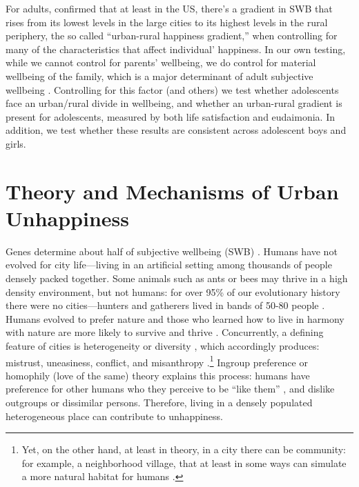 \documentclass[10pt, letterpaper]{article}
\begin{document}
\begin{spacing}{1.4}
For adults,  \citet{aok11a} confirmed that at least in the
US, there's a gradient in SWB that rises from its lowest levels in the large
cities to its highest levels in the rural periphery, the so called ``urban-rural
happiness gradient,'' when controlling for many of the characteristics that
affect individual' happiness. In our own testing, while we cannot control for
parents' wellbeing, we do control for material wellbeing of the family, which is
a major determinant of adult subjective wellbeing \citep{clark2018}. Controlling for
this factor (and others) we test whether adolescents face an urban/rural divide
in wellbeing, and whether an urban-rural gradient is present for adolescents,
measured by both life satisfaction and eudaimonia. In addition, we test whether
these results are consistent across adolescent boys and girls.




\section*{Theory and Mechanisms of Urban Unhappiness}

 Genes determine about half of subjective wellbeing (SWB)
 \citep{schnittker08,lykken96t,brooksGenetic}.
 Humans have not
evolved for city life---living in an artificial setting among thousands of people densely packed together. Some animals such as ants or bees may thrive in a high density environment, but not humans: for over 95\% of our evolutionary history there were no cities---hunters and
gatherers lived in bands of 50-80 people \citep{maryanski92}. Humans evolved to
prefer nature and those who learned how to live in harmony with nature are more
likely to survive and thrive \citep{pretty12,yamamoto16}. 
Concurrently, a defining feature of cities is heterogeneity or diversity \citep{wirth38}, which accordingly produces: 
 mistrust, uneasiness, conflict, and misanthropy
 \citep{milgram70,thrift05,amin06,aok22}.\footnote{Yet, on the other hand, at least in theory, in a city there can be community: for example, a neighborhood village, that at least in some ways can simulate a more natural habitat for humans \citep{fischer95,fischer75,jacobs93}.}
Ingroup preference or homophily (love of the same) theory explains this process: humans have preference for other humans who they perceive to be ``like them'' \citep{mcpherson01,tajfel82,tajfel71,smelser99,putnam07,christakis09f}, and dislike outgroups or dissimilar persons. Therefore, living in a densely populated heterogeneous place can contribute to unhappiness.



\end{spacing}
\end{document}

